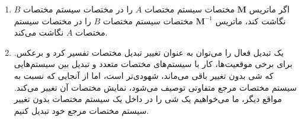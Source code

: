 {\begin{spacing}{1.5}
\begin{enumerate}[label=\textbf{\arabic*}.]
            \item {اگر ماتریس $\textbf{M}$ مختصات سیستم مختصات $A$ را در مختصات سیستم مختصات $B$ نگاشت کند،
            ماتریس $\textbf{M}^{-1}$ مختصات سیستم مختصات $B$ را در مختصات سیستم مختصات $A$ نگاشت می‌کند.}  \\\textbf{\vspace{6pt}}

            \item {یک تبدیل فعال را می‌توان به عنوان تغییر تبدیل مختصات تفسیر کرد و برعکس.
            برای برخی موقعیت‌ها، کار با سیستم‌های مختصات متعدد و تبدیل بین سیستم‌هایی که شی بدون تغییر باقی می‌ماند، شهودی‌تر است،
            اما از آنجایی که نسبت به سیستم مختصات مرجع متفاوتی توصیف می‌شود، نمایش مختصات آن تغییر می‌کند.
            مواقع دیگر، ما می‌خواهیم یک شی را در داخل یک سیستم مختصات بدون تغییر سیستم مختصات مرجع خود تبدیل کنیم.}
        \end{enumerate}
    \end{spacing}
}
\newpage


